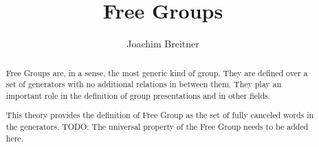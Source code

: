 \documentclass[11pt,a4paper]{article}
\begin{document}
\title{Free Groups}
\author{Joachim Breitner}
\maketitle

\begin{abstract}
  Free Groups are, in a sense, the most generic kind of group. They are defined
  over a set of generators with no additional relations in between them. They
  play an important role in the definition of group presentations and in
  other fields. %

  This theory provides the definition of Free Group as the set of fully
  canceled words in the generators. TODO: The universal property of the Free
  Group needs to be added here. 
\end{abstract}

\tableofcontents



%
%
\end{document}
